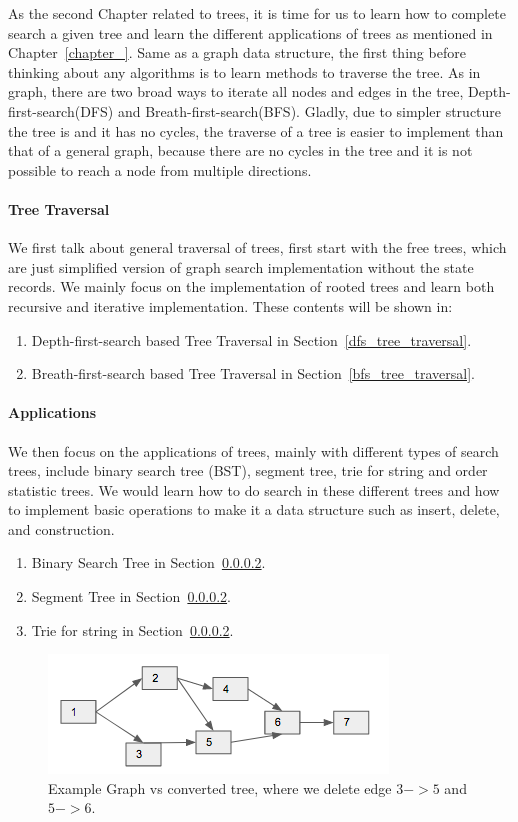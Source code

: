 \documentclass[../main.tex]{subfiles}
\begin{document}
As the second Chapter related to trees, it is time for us to learn how to complete search a given tree and learn the different applications of trees as mentioned in Chapter~\ref{chapter_}. Same as a graph data structure, the first thing before thinking about any algorithms is to learn methods to traverse the tree. As in graph, there are two broad ways to iterate all nodes and edges in the tree, Depth-first-search(DFS) and Breath-first-search(BFS). Gladly, due to simpler structure the tree is and it has no cycles, the traverse of a tree is easier to implement than that of a general graph, because there are no cycles in the tree and it is not possible to reach a node from multiple directions. 

\paragraph{Tree Traversal} We first talk about general traversal of trees, first start with the free trees, which are just simplified version of graph search implementation without the state records. We mainly focus on the implementation of rooted trees and learn both recursive and iterative implementation. These contents will be shown in:
\begin{enumerate}
    \item Depth-first-search based Tree Traversal in Section~\ref{dfs_tree_traversal}.
    \item Breath-first-search based Tree Traversal in Section~\ref{bfs_tree_traversal}.
\end{enumerate} 

\paragraph{Applications} We then focus on the applications of trees, mainly with different types of search trees, include binary search tree (BST), segment tree, trie for string and order statistic trees. We would learn how to do search in these different trees and how to implement basic operations to make it a data structure such as insert, delete, and construction. 
\begin{enumerate}
    \item Binary Search Tree in Section~\ref{}.
    \item Segment Tree in Section~\ref{}.
    \item Trie for string in Section~\ref{}.
\end{enumerate}

\begin{figure}[h]
    \centering
    \includegraphics[width=0.6\columnwidth]{fig/example_graph.png}
    \caption{Example Graph vs converted tree, where we delete edge $3->5$ and $5->6$.}
    \label{example_graph_tree}
\end{figure}
\end{document}
